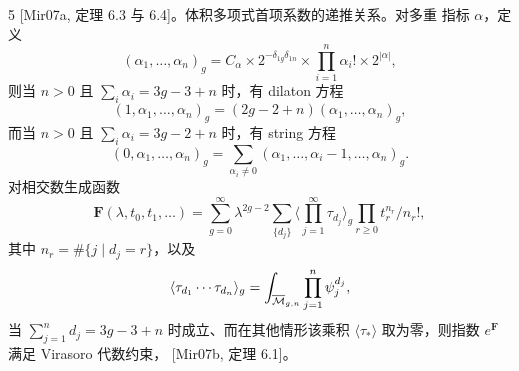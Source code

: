 \begin{thm}{5} [Mir07a, 定理 6.3 与 6.4]。体积多项式首项系数的递推关系。对多重
指标 $\alpha$，定义
\[
(\alpha_1,\dots,\alpha_n)_g=C_\alpha\times2^{-\delta_{1g}\delta_{1n}}
\times\prod_{i=1}^n\alpha_i!\times2^{|\alpha|},
\]
则当 $n>0$ 且 $\sum_i\alpha_i=3g-3+n$ 时，有 dilaton 方程
\[
(1,\alpha_1,\dots,\alpha_n)_g=(2g-2+n)(\alpha_1,\dots,\alpha_n)_g,
\]
而当 $n>0$ 且 $\sum_i\alpha_i=3g-2+n$ 时，有 string 方程
\[
(0,\alpha_1,\dots,\alpha_n)_g=\sum_{\alpha_i\neq0}(\alpha_1,\dots,\alpha_i-1,\dots,\alpha_n)_g.
\]
对相交数生成函数
\[
\mathbf{F}(\lambda,t_0,t_1,\dots)=\sum_{g=0}^\infty\lambda^{2g-2}
\sum_{\{d_j\}}\langle\prod_{j=1}^\infty\tau_{d_j}\rangle_g\prod_{r\ge0}t_r^{n_r}/n_r!,
\]
其中 $n_r=\#\{j\mid d_j=r\}$，以及
\[
\langle\tau_{d_1}\cdots\tau_{d_n}\rangle_g=\int_{\overline{\mathcal{M}}_{g,n}}\prod_{j=1}^n\psi_j^{d_j},
\]
当 $\sum_{j=1}^n d_j=3g-3+n$ 时成立、而在其他情形该乘积 $\langle\tau_*\rangle$
取为零，则指数 $e^{\mathbf{F}}$ 满足 Virasoro 代数约束，
[Mir07b, 定理 6.1]。\end{thm}

